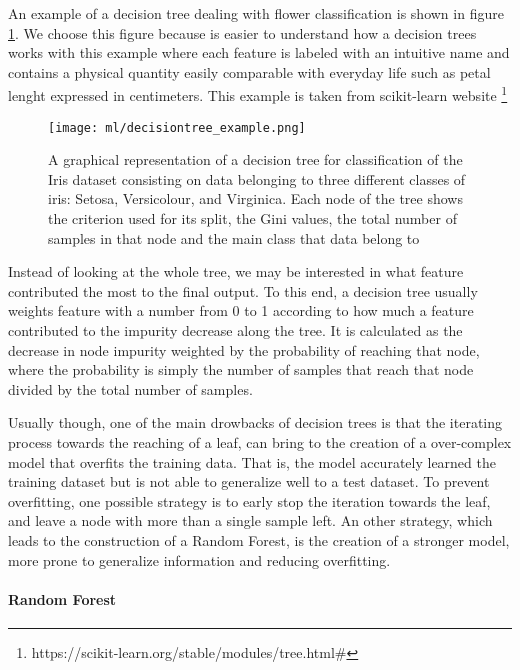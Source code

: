 \documentclass[11pt]{report}
\begin{document}
An example of a decision tree dealing with flower classification is shown in figure \ref{fig:decisiontree}.
We choose this figure because is easier to understand how a decision trees works with this example where each feature is labeled with an intuitive name and contains a physical quantity easily comparable with everyday life such as petal lenght expressed in centimeters.
This example is taken from scikit-learn website \footnote{https://scikit-learn.org/stable/modules/tree.html\#}

\begin{figure}
\centering
\texttt{[image: ml/decisiontree\_example.png]}
\caption{A graphical representation of a decision tree for classification of the Iris dataset consisting on data belonging to three different classes of iris: Setosa, Versicolour, and Virginica. Each node of the tree shows the criterion used for its split, the Gini values, the total number of samples in that node and the main class that data belong to}
\label{fig:decisiontree}
\end{figure}

Instead of looking at the whole tree, we may be interested in what feature contributed the most to the final output.
To this end, a decision tree usually weights feature with a number from 0 to 1 according to how much a feature contributed to the impurity decrease along the tree.
It is calculated as the decrease in node impurity weighted by the probability of reaching that node, where the probability is simply the number of samples that reach that node divided by the total number of samples.
\cite{raschka-2019} \cite{muller-2017}

Usually though, one of the main drowbacks of decision trees is that the iterating process towards the reaching of a leaf, can bring to the creation of a over-complex model that overfits the training data.
That is, the model accurately learned the training dataset but is not able to generalize well to a test dataset.
To prevent overfitting, one possible strategy is to early stop the iteration towards the leaf, and leave a node with more than a single sample left.
An other strategy, which leads to the construction of a Random Forest, is the creation of a stronger model, more prone to generalize information and reducing overfitting.

\paragraph{Random Forest} \hfill
\end{document}
